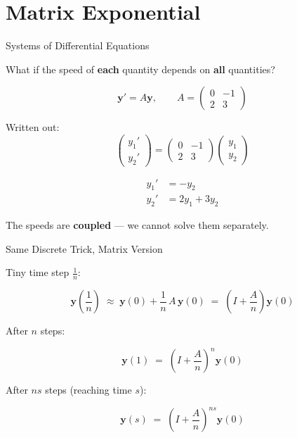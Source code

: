 \documentclass[10pt]{beamer}
\theoremstyle{definition}
\newcommand{\x}[1]{\alert{\textbf{#1}}}
\begin{document}
\section{Matrix Exponential}


\begin{frame}{Systems of Differential Equations}

What if the speed of \x{each} quantity depends on \x{all} quantities?

\vfill

$$\mathbf{y}' = A\mathbf{y}, \qquad A = \begin{pmatrix} 0 & -1 \\ 2 & 3 \end{pmatrix}$$

\vfill\pause

Written out:
$$\begin{pmatrix} y_1' \\ y_2' \end{pmatrix} = \begin{pmatrix} 0 & -1 \\ 2 & 3 \end{pmatrix}\begin{pmatrix} y_1 \\ y_2 \end{pmatrix}$$

\vfill

\begin{align*}
y_1' &= -y_2 \\
y_2' &= 2y_1 + 3y_2
\end{align*}

\vfill

The speeds are \x{coupled} --- we cannot solve them separately.

\end{frame}


\begin{frame}{Same Discrete Trick, Matrix Version}

Tiny time step $\frac{1}{n}$:

$$\mathbf{y}\!\left(\frac{1}{n}\right) \;\approx\; \mathbf{y}(0) + \frac{1}{n}\,A\,\mathbf{y}(0) \;=\; \left(I + \frac{A}{n}\right)\mathbf{y}(0)$$

\vfill\pause

After $n$ steps:

$$\mathbf{y}(1) \;=\; \left(I + \frac{A}{n}\right)^n \mathbf{y}(0)$$

\vfill\pause

After $ns$ steps (reaching time $s$):

$$\mathbf{y}(s) \;=\; \left(I + \frac{A}{n}\right)^{ns} \mathbf{y}(0)$$

\end{frame}
\end{document}
